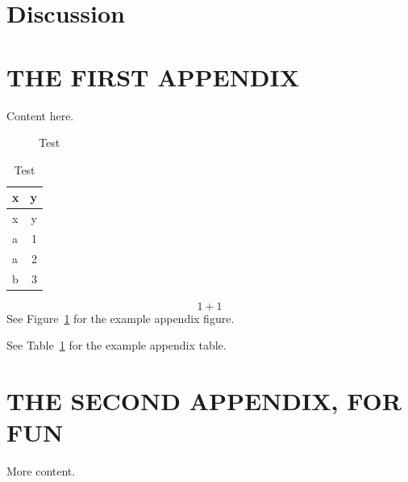 \documentclass[12pt]{article}\usepackage[]{graphicx}\usepackage[]{color}
\begin{document}
\hypertarget{discussion}{%
\section{Discussion}\label{discussion}}

\begin{appendices}

\clearpage

\section{THE FIRST APPENDIX}
\label{app:first-appendix}

Content here.
\begin{figure}[htb]

{\centering {} 

}

\caption{Test}\label{fig:test1}
\end{figure}
\begin{longtable}[]{@{}lr@{}}
\caption{\label{tab:test2}Test}\tabularnewline
\toprule
x & y\tabularnewline
\midrule
\endfirsthead
\toprule
x & y\tabularnewline
\midrule
\endhead
a & 1\tabularnewline
a & 2\tabularnewline
b & 3\tabularnewline
\bottomrule
\end{longtable}
\begin{equation}
  1 + 1
  \label{eq:test2}
\end{equation}
See Figure~\ref{fig:test1} for the example appendix figure.

See Table~\ref{tab:test2} for the example appendix table.

\clearpage

\section{THE SECOND APPENDIX, FOR FUN}
\label{app:second-appendix}

More content.

\end{appendices}
\end{document}
